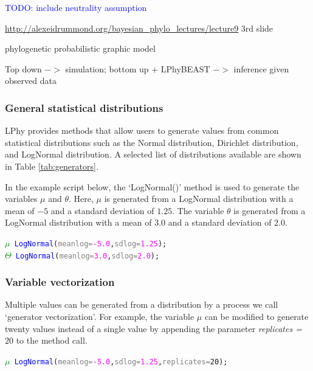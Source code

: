 \documentclass[10pt,letterpaper,table]{article}
\begin{document}
\textcolor{blue}{TODO: include neutrality assumption}

\url{http://alexeidrummond.org/bayesian_phylo_lectures/lecture9} 3rd slide

phylogenetic probabilistic graphic model

Top down $->$ simulation; bottom up + LPhyBEAST $->$ inference given observed data



\subsubsection{General statistical distributions}
LPhy provides methods that allow users to generate values from common statistical distributions such as the Normal distribution, Dirichlet distribution, and LogNormal distribution. 
A selected list of distributions available are shown in Table \ref{tab:generators}. 

In the example script below, the `LogNormal()' method is used to generate the variables $\mu$ and $\theta$. 
Here, $\mu$ is generated from a LogNormal distribution with a mean of $-5$ and a standard deviation of $1.25$. 
The variable $\theta$ is generated from a LogNormal distribution with a mean of $3.0$ and a standard deviation of $2.0$.  

{\singlespacing
\begin{alltt}
  \textcolor{green}{\(\mu\)} ~ \textcolor{blue}{LogNormal}(\textcolor{gray}{meanlog=}\textcolor{magenta}{-5.0}, \textcolor{gray}{sdlog=}\textcolor{magenta}{1.25});
  \textcolor{green}{\(\Theta\)} ~ \textcolor{blue}{LogNormal}(\textcolor{gray}{meanlog=}\textcolor{magenta}{3.0}, \textcolor{gray}{sdlog=}\textcolor{magenta}{2.0});
\end{alltt}
}


\subsubsection{Variable vectorization}

Multiple values can be generated from a distribution by a process we call `generator vectorization'. 
For example, the variable $\mu$ can be modified to generate twenty values instead of a single value by appending the parameter \textit{replicates = $20$} to the method call. 

{\singlespacing
\begin{alltt}
  \textcolor{green}{\(\mu\)} ~ \textcolor{blue}{LogNormal}(\textcolor{gray}{meanlog=}\textcolor{magenta}{-5.0}, \textcolor{gray}{sdlog=}\textcolor{magenta}{1.25}, \textcolor{gray}{replicates=}20);
\end{alltt}
}
\end{document}
